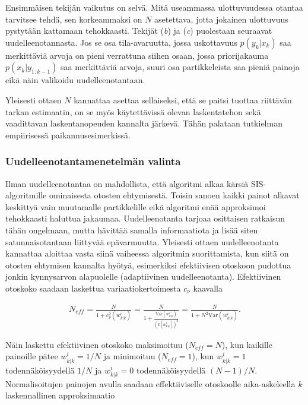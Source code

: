 \documentclass[
  12pt,
  a4paper, twoside]{book}
\begin{document}
Ensimmäisen tekijän vaikutus on selvä. Mitä useammassa ulottuvuudessa otantaa tarvitsee tehdä, sen korkeammaksi on \(N\) asetettava, jotta jokainen ulottuvuus pystytään kattamaan tehokkaasti. Tekijät (\textit{b}) ja (\textit{c}) puolestaan seuraavat uudelleenotannasta. Jos se osa tila-avaruutta, jossa uskottavuus \(p(y_k|x_k)\) saa merkittäviä arvoja on pieni verrattuna siihen osaan, jossa priorijakauma \(p(x_k|y_{1:k-1})\) saa merkittäviä arvoja, suuri osa partikkeleista saa pieniä painoja eikä näin valikoidu uudelleenotantaan.

Yleisesti ottaen \(N\) kannattaa asettaa sellaiseksi, että se paitsi tuottaa riittävän tarkan estimaatin, on se myös käytettävissä olevan laskentatehon sekä vaadittavan laskentanopeuden kannalta järkevä. Tähän palataan tutkielman empiirisessä paikannusesimerkissä.

\subsubsection{Uudelleenotantamenetelmän valinta} \label{uudelleenotantamenetelman-valinta}

Ilman uudelleenotantaa on mahdollista, että algoritmi alkaa kärsiä SIS-algoritmille ominaisesta otosten ehtymisestä. Toisin sanoen kaikki painot alkavat keskittyä vain muutamalle partikkelille eikä algoritmi enää approksimoi tehokkaasti haluttua jakaumaa. Uudelleenotanta tarjoaa osittaisen ratkaisun tähän ongelmaan, mutta hävittää samalla informaatiota ja lisää siten satunnaisotantaan liittyvää epävarmuutta. Yleisesti ottaen uudelleenotanta kannattaa aloittaa vasta siinä vaiheessa algoritmin suorittamista, kun siitä on otosten ehtymisen kannalta hyötyä, esimerkiksi efektiivisen otoskoon pudottua jonkin kynnysarvon alapuolelle (adaptiivinen uudelleenotanta). Efektiivinen otoskoko saadaan laskettua variaatiokertoimesta \(c_\nu\) kaavalla

\begin{align}\label{N-eff}
N_{eff}= \frac{N}{1+c_\nu^2(w^i_{k|k})} = \frac{N}{1+\frac{\text{Var}(w^i_{k|k})}{(\mathbb{E}[w^i_{k|k}])^2}} =\frac{N}{1+N^2\text{Var}(w^i_{k|k})}.
\end{align}

Näin laskettu efektiivinen otoskoko maksimoituu (\(N_{eff}=N\)), kun kaikille painoille pätee \(w^i_{k|k}=1/N\) ja minimoituu (\(N_{eff}=1\)), kun \(w^i_{k|k}=1\) todennäköisyydellä \(1/N\) ja \(w^i_{k|k}=0\) todennäköisyydellä \((N-1)/N\). Normalisoitujen painojen avulla saadaan effektiiviselle otoskoolle aika-askeleella \(k\) laskennallinen approksimaatio
\end{document}
